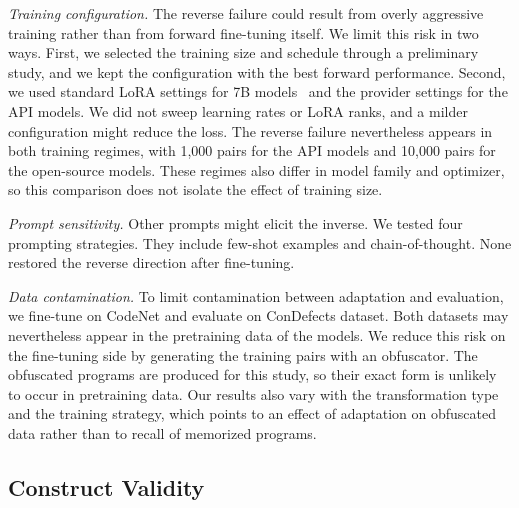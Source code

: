 \textit{Training configuration.}
The reverse failure could result from overly aggressive training rather than from forward fine-tuning itself.
We limit this risk in two ways.
First, we selected the training size and schedule through a preliminary study, and we kept the configuration with the best forward performance.
Second, we used standard LoRA settings for 7B models~\cite{hu2022lora} and the provider settings for the API models.
We did not sweep learning rates or LoRA ranks, and a milder configuration might reduce the loss.
The reverse failure nevertheless appears in both training regimes, with 1,000 pairs for the API models and 10,000 pairs for the open-source models.
These regimes also differ in model family and optimizer, so this comparison does not isolate the effect of training size.

\textit{Prompt sensitivity.}
Other prompts might elicit the inverse.
We tested four prompting strategies.
They include few-shot examples and chain-of-thought.
None restored the reverse direction after fine-tuning.

\textit{Data contamination.}
To limit contamination between adaptation and evaluation, we fine-tune on CodeNet and evaluate on ConDefects dataset.
Both datasets may nevertheless appear in the pretraining data of the models.
We reduce this risk on the fine-tuning side by generating the training pairs with an obfuscator.
The obfuscated programs are produced for this study, so their exact form is unlikely to occur in pretraining data.
Our results also vary with the transformation type and the training strategy, which points to an effect of adaptation on obfuscated data rather than to recall of memorized programs.

\subsection{Construct Validity}



